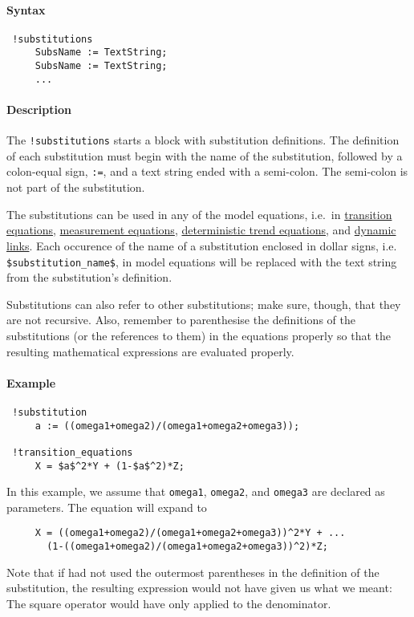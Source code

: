


	\paragraph{Syntax}
 
 \begin{verbatim}
 !substitutions
     SubsName := TextString;
     SubsName := TextString;
     ...
 \end{verbatim}
 
 \paragraph{Description}
 
 The \texttt{!substitutions} starts a block with substitution
 definitions. The definition of each substitution must begin with the
 name of the substitution, followed by a colon-equal sign, \texttt{:=},
 and a text string ended with a semi-colon. The semi-colon is not part of
 the substitution.
 
 The substitutions can be used in any of the model equations, i.e.~in
 \href{modellang/transitionequations}{transition equations},
 \href{modellang/measurementequations}{measurement equations},
 \href{modellang/dtrends}{deterministic trend equations}, and
 \href{modellang/links}{dynamic links}. Each occurence of the name of a
 substitution enclosed in dollar signs, i.e.
 \texttt{\$substitution\_name\$}, in model equations will be replaced
 with the text string from the substitution's definition.
 
 Substitutions can also refer to other substitutions; make sure, though,
 that they are not recursive. Also, remember to parenthesise the
 definitions of the substitutions (or the references to them) in the
 equations properly so that the resulting mathematical expressions are
 evaluated properly.
 
 \paragraph{Example}
 
 \begin{verbatim}
 !substitution
     a := ((omega1+omega2)/(omega1+omega2+omega3));
 
 !transition_equations
     X = $a$^2*Y + (1-$a$^2)*Z;
 \end{verbatim}
 
 In this example, we assume that \texttt{omega1}, \texttt{omega2}, and
 \texttt{omega3} are declared as parameters. The equation will expand to
 
 \begin{verbatim}
     X = ((omega1+omega2)/(omega1+omega2+omega3))^2*Y + ...
       (1-((omega1+omega2)/(omega1+omega2+omega3))^2)*Z;
 \end{verbatim}
 
 Note that if had not used the outermost parentheses in the definition of
 the substitution, the resulting expression would not have given us what
 we meant: The square operator would have only applied to the
 denominator.


